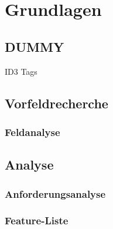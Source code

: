 \chapter{Grundlagen}
\label{cha:grundlagen}

\section{DUMMY}
ID3 Tags

\section{Vorfeldrecherche}
\subsection{Feldanalyse}

\section{Analyse}
\subsection{Anforderungsanalyse}
\subsection{Feature-Liste}
